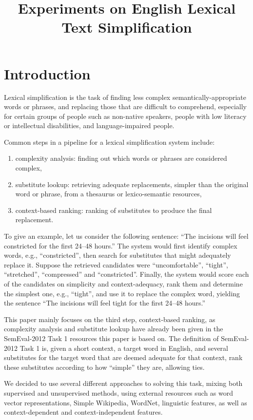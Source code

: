 \documentclass[10pt, a4paper]{article}
\title{Experiments on English Lexical Text Simplification}
\begin{document}
\maketitleabstract

\section{Introduction}

Lexical simplification is the task of finding  less complex semantically-appropriate words or phrases, and replacing those that are difficult to comprehend, especially for certain groups of people such as non-native speakers, people with low literacy or intellectual disabilities, and language-impaired people.

Common steps in a pipeline for a lexical simplification system include:
\begin{enumerate}
\item complexity analysis: finding out which words or phrases are considered complex,
\item substitute lookup: retrieving adequate replacements, simpler than the original word or phrase, from a thesaurus or lexico-semantic resources,
\item context-based ranking: ranking of substitutes to produce the final replacement.
\end{enumerate}

To give an example, let us consider the following sentence: ``The incisions will feel constricted for the first 24--48 hours.'' The system would first identify complex words, e.g., ``constricted'', then search for substitutes that might adequately replace it. Suppose the retrieved candidates were ``uncomfortable'', ``tight'', ``stretched'', ``compressed'' and ``constricted''. Finally, the system would score each of the candidates on simplicity and context-adequacy, rank them and determine the simplest one, e.g., ``tight'', and use it to replace the complex word, yielding the sentence ``The incisions will feel tight for the first 24--48 hours.''

This paper mainly focuses on the third step, context-based ranking, as complexity analysis and substitute lookup have already been given in the SemEval-2012 Task 1 resources this paper is based on. The definition of SemEval-2012 Task 1 is, given a short context, a target word in English, and several substitutes for the target word that are deemed adequate for that context, rank these substitutes according to how “simple” they are, allowing ties.

We decided to use several different approaches to solving this task, mixing both supervised and unsupervised methods, using external resources such as word vector representations, Simple Wikipedia, WordNet, linguistic features, as well as context-dependent and context-independent features.
\end{document}

